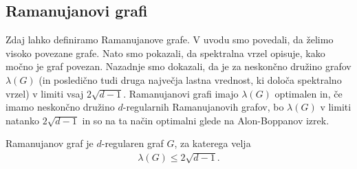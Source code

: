 \subsection{Ramanujanovi grafi}
Zdaj lahko definiramo Ramanujanove grafe. V uvodu smo povedali, da želimo visoko povezane grafe. Nato smo pokazali, da spektralna vrzel opisuje, kako močno je graf povezan. Nazadnje smo dokazali, da je za neskončno družino grafov \(\lambda(G)\) (in posledično tudi druga največja lastna vrednost, ki določa spektralno vrzel) v limiti vsaj \(2\sqrt{d-1}\). Ramanujanovi grafi imajo \(\lambda(G)\) optimalen in, če imamo neskončno družino \(d\)-regularnih Ramanujanovih grafov, bo \(\lambda(G)\) v limiti natanko \(2\sqrt{d-1}\) in so na ta način optimalni glede na Alon-Boppanov izrek.

\begin{definicija}
    Ramanujanov graf je \(d\)-regularen graf \(G\), za katerega velja
    \begin{align*}
        \lambda(G) \leq 2\sqrt{d-1}.
    \end{align*}
\end{definicija}


